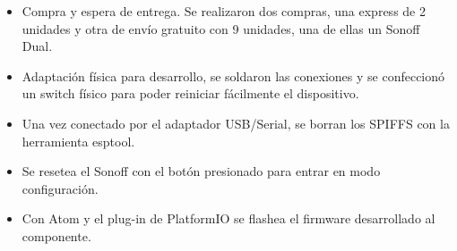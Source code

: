 \begin{itemize}

\item Compra y espera de entrega. Se realizaron dos compras, una express de 2 unidades y otra de envío gratuito con 9 unidades, una de ellas un Sonoff Dual.

\item Adaptación física para desarrollo, se soldaron las conexiones y se confeccionó un switch físico para poder reiniciar fácilmente el dispositivo.

\item Una vez conectado por el adaptador USB/Serial, se borran los SPIFFS con la herramienta esptool.

\item Se resetea el Sonoff con el botón presionado para entrar en modo configuración.

\item Con Atom y el plug-in de PlatformIO se flashea el firmware desarrollado al componente.

\end{itemize}





